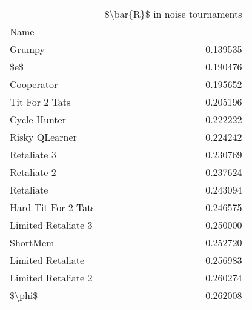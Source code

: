 \begin{tabular}{lr}
\toprule
{} &  \$\textbackslash bar\{R\}\$ in noise tournaments \\
Name                &                                 \\
\midrule
Grumpy              &                        0.139535 \\
\$e\$                 &                        0.190476 \\
Cooperator          &                        0.195652 \\
Tit For 2 Tats      &                        0.205196 \\
Cycle Hunter        &                        0.222222 \\
Risky QLearner      &                        0.224242 \\
Retaliate 3         &                        0.230769 \\
Retaliate 2         &                        0.237624 \\
Retaliate           &                        0.243094 \\
Hard Tit For 2 Tats &                        0.246575 \\
Limited Retaliate 3 &                        0.250000 \\
ShortMem            &                        0.252720 \\
Limited Retaliate   &                        0.256983 \\
Limited Retaliate 2 &                        0.260274 \\
\$\textbackslash phi\$              &                        0.262008 \\
\bottomrule
\end{tabular}

